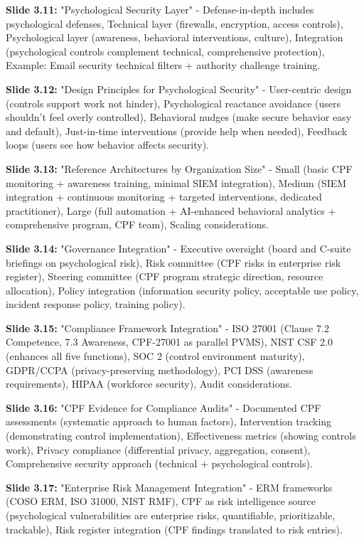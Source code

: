 \documentclass[11pt,a4paper]{article}
\begin{document}
\textbf{Slide 3.11:} "Psychological Security Layer" - Defense-in-depth includes psychological defenses, Technical layer (firewalls, encryption, access controls), Psychological layer (awareness, behavioral interventions, culture), Integration (psychological controls complement technical, comprehensive protection), Example: Email security technical filters + authority challenge training.

\textbf{Slide 3.12:} "Design Principles for Psychological Security" - User-centric design (controls support work not hinder), Psychological reactance avoidance (users shouldn't feel overly controlled), Behavioral nudges (make secure behavior easy and default), Just-in-time interventions (provide help when needed), Feedback loops (users see how behavior affects security).

\textbf{Slide 3.13:} "Reference Architectures by Organization Size" - Small (basic CPF monitoring + awareness training, minimal SIEM integration), Medium (SIEM integration + continuous monitoring + targeted interventions, dedicated practitioner), Large (full automation + AI-enhanced behavioral analytics + comprehensive program, CPF team), Scaling considerations.

\textbf{Slide 3.14:} "Governance Integration" - Executive oversight (board and C-suite briefings on psychological risk), Risk committee (CPF risks in enterprise risk register), Steering committee (CPF program strategic direction, resource allocation), Policy integration (information security policy, acceptable use policy, incident response policy, training policy).

\textbf{Slide 3.15:} "Compliance Framework Integration" - ISO 27001 (Clause 7.2 Competence, 7.3 Awareness, CPF-27001 as parallel PVMS), NIST CSF 2.0 (enhances all five functions), SOC 2 (control environment maturity), GDPR/CCPA (privacy-preserving methodology), PCI DSS (awareness requirements), HIPAA (workforce security), Audit considerations.

\textbf{Slide 3.16:} "CPF Evidence for Compliance Audits" - Documented CPF assessments (systematic approach to human factors), Intervention tracking (demonstrating control implementation), Effectiveness metrics (showing controls work), Privacy compliance (differential privacy, aggregation, consent), Comprehensive security approach (technical + psychological controls).

\textbf{Slide 3.17:} "Enterprise Risk Management Integration" - ERM frameworks (COSO ERM, ISO 31000, NIST RMF), CPF as risk intelligence source (psychological vulnerabilities are enterprise risks, quantifiable, prioritizable, trackable), Risk register integration (CPF findings translated to risk entries).
\end{document}
